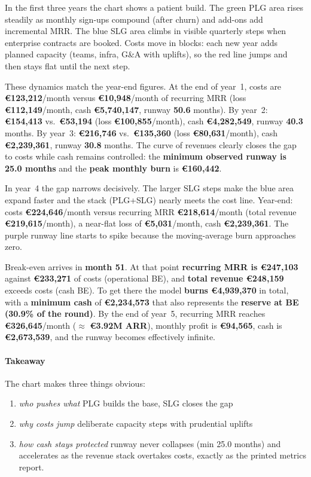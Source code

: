 \documentclass[11pt, a4paper, oneside]{article}
\begin{document}
In the first three years the chart shows a patient build. The green PLG area rises steadily as monthly sign-ups compound (after churn) and add-ons add incremental MRR. The blue SLG area climbs in visible quarterly steps when enterprise contracts are booked. Costs move in blocks: each new year adds planned capacity (teams, infra, G\&A with uplifts), so the red line jumps and then stays flat until the next step.

These dynamics match the year-end figures. At the end of year~1, costs are \textbf{€123{,}212}/month versus \textbf{€10{,}948}/month of recurring MRR (loss \textbf{€112{,}149}/month, cash \textbf{€5{,}740{,}147}, runway \textbf{50.6} months). By year~2: \textbf{€154{,}413} vs.\ \textbf{€53{,}194} (loss \textbf{€100{,}855}/month), cash \textbf{€4{,}282{,}549}, runway \textbf{40.3} months. By year~3: \textbf{€216{,}746} vs.\ \textbf{€135{,}360} (loss \textbf{€80{,}631}/month), cash \textbf{€2{,}239{,}361}, runway \textbf{30.8} months. The curve of revenues clearly closes the gap to costs while cash remains controlled: the \textbf{minimum observed runway is 25.0 months} and the \textbf{peak monthly burn} is \textbf{€160{,}442}.

In year~4 the gap narrows decisively. The larger SLG steps make the blue area expand faster and the stack (PLG+SLG) nearly meets the cost line. Year-end: costs \textbf{€224{,}646}/month versus recurring MRR \textbf{€218{,}614}/month (total revenue \textbf{€219{,}615}/month), a near-flat loss of \textbf{€5{,}031}/month, cash \textbf{€2{,}239{,}361}. The purple runway line starts to spike because the moving-average burn approaches zero.

Break-even arrives in \textbf{month 51}. At that point \textbf{recurring MRR is €247{,}103} against \textbf{€233{,}271} of costs (operational BE), and \textbf{total revenue €248{,}159} exceeds costs (cash BE). To get there the model \textbf{burns €4{,}939{,}370} in total, with a \textbf{minimum cash} of \textbf{€2{,}234{,}573} that also represents the \textbf{reserve at BE (30.9\% of the round)}. By the end of year~5, recurring MRR reaches \textbf{€326{,}645}/month ($\approx$ \textbf{€3.92M ARR}), monthly profit is \textbf{€94{,}565}, cash is \textbf{€2{,}673{,}539}, and the runway becomes effectively infinite.

\paragraph{Takeaway}
The chart makes three things obvious:
\begin{enumerate}
\item \emph{who pushes what} PLG builds the base, SLG closes the gap
\item \emph{why costs jump} deliberate capacity steps with prudential uplifts
\item \emph{how cash stays protected} runway never collapses (min 25.0 months) and accelerates as the revenue stack overtakes costs, exactly as the printed metrics report.
\end{enumerate}
\end{document}
